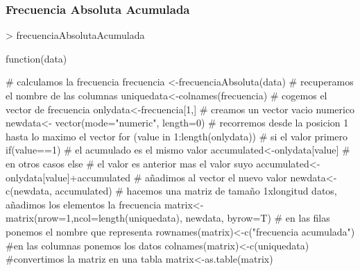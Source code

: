 \documentclass [a4paper] {article}
\begin{document}
\subsubsection{Frecuencia Absoluta Acumulada}
\begin{Schunk}
\begin{Sinput}
> frecuenciaAbsolutaAcumulada
\end{Sinput}
\begin{Soutput}
function(data){

    # calculamos la frecuencia
    frecuencia <-frecuenciaAbsoluta(data)
    # recuperamos el nombre de las columnas
    uniquedata<-colnames(frecuencia)
    # cogemos el vector de frecuencia
    onlydata<-frecuencia[1,]
    # creamos un vector vacio numerico
    newdata<- vector(mode="numeric", length=0)
    # recorremos desde la posicion 1 hasta lo maximo el vector
    for (value in 1:length(onlydata)) {
        # si el valor primero
        if(value==1){   
            # el acumulado es el mismo valor
            accumulated<-onlydata[value]
        # en otros casos
        }else{
            # el valor es anterior mas el valor suyo
            accumulated<-onlydata[value]+accumulated
        }
        # añadimos al vector el nuevo valor
        newdata<-c(newdata, accumulated)
    }
    # hacemos una matriz de tamaño 1xlongitud datos, añadimos los elementos la frecuencia
    matrix<-matrix(nrow=1,ncol=length(uniquedata), newdata, byrow=T)
    # en las filas ponemos el nombre que representa
    rownames(matrix)<-c("frecuencia acumulada")
    #en las columnas ponemos los datos
    colnames(matrix)<-c(uniquedata)
    #convertimos la matriz en una tabla
    matrix<-as.table(matrix)
}
\end{Soutput}
\end{Schunk}
\end{document}
